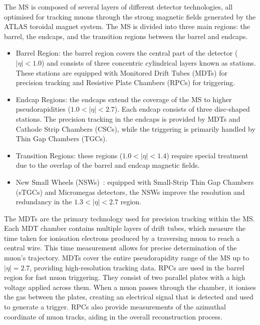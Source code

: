         The MS is composed of several layers of different detector technologies, all optimised for 
        tracking muons through the strong magnetic fields generated by the ATLAS toroidal magnet system. 
        The MS is divided into three main regions: the barrel, the endcaps, and the transition regions 
        between the barrel and endcaps.
        \begin{itemize}
        \item Barrel Region: the barrel region covers the central part of the detector (\(|\eta| < 1.0\)) and consists of three concentric cylindrical layers known as stations. These stations are equipped with Monitored Drift Tubes (MDTs) for precision tracking and Resistive Plate Chambers (RPCs) for triggering.
        \item Endcap Regions: the endcaps extend the coverage of the MS to higher pseudorapidities (\(1.0 <|\eta| < 2.7\)). Each endcap consists of three disc-shaped stations. The precision tracking in the endcaps is provided by MDTs and Cathode Strip Chambers (CSCs), while the triggering is primarily handled by Thin Gap Chambers (TGCs).
        \item Transition Regions: these regions (\(1.0 < |\eta| < 1.4\)) require special treatment due to the overlap of the barrel and endcap magnetic fields. 
        \item New Small Wheels (NSWs)~\cite{ATLAS-TDR-20}: equipped with Small-Strip Thin Gap Chambers (sTGCs) and Micromegas detectors, the NSWs improve the resolution and redundancy in the $1.3 < |\eta| < 2.7$ region.
        \end{itemize}
        The MDTs are the primary technology used for precision tracking within the MS. Each MDT chamber 
        contains multiple layers of drift tubes, which measure the time taken for ionisation electrons 
        produced by a traversing muon to reach a central wire. This time measurement allows for precise 
        determination of the muon's trajectory. MDTs cover the entire pseudorapidity range of the MS 
        up to \(|\eta| = 2.7\), providing high-resolution tracking data.
        RPCs are used in the barrel region for fast muon triggering. They consist of two parallel plates 
        with a high voltage applied across them. When a muon passes through the chamber, it ionises the 
        gas between the plates, creating an electrical signal that is detected and used to generate a 
        trigger. RPCs also provide measurements of the azimuthal coordinate of muon tracks, aiding 
        in the overall reconstruction process.
